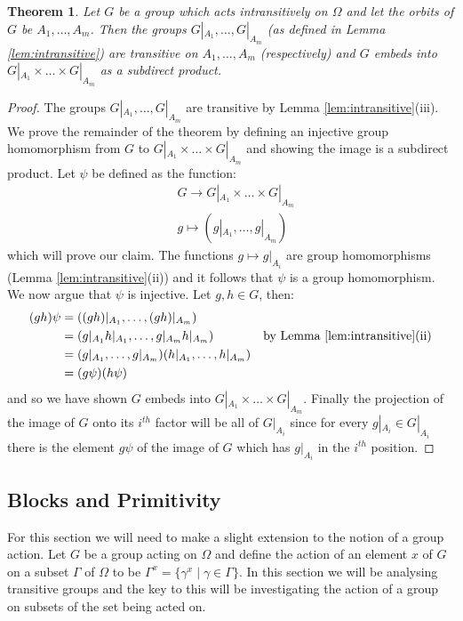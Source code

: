 \documentclass[]{article}
\newtheorem{thm}{Theorem}[section]
\theoremstyle{definition}
\begin{document}
\begin{thm} \label{thm:intransitive}
	Let $G$ be a group which acts intransitively on $\Omega$ and let the orbits of $G$ be $A_1, \dots, A_m$. Then the groups $G|_{A_1}, \dots, G|_{A_m}$ (as defined in Lemma \ref{lem:intransitive}) are transitive on $A_1,\dots ,A_m$ (respectively) and $G$ embeds into $G|_{A_1} \times \dots \times G|_{A_m}$ as a subdirect product.
\end{thm}

\begin{proof}
	The groups $G|_{A_1}, \dots, G|_{A_m}$ are transitive by Lemma \ref{lem:intransitive}(iii). We prove the remainder of the theorem by defining an injective group homomorphism from $G$ to $G|_{A_1} \times \dots \times G|_{A_m}$ and showing the image is a subdirect product. Let $\psi$ be defined as the function:
	\begin{align*}
		& G \rightarrow G|_{A_1} \times \dots \times G|_{A_m} \\
		& g \mapsto (g|_{A_1}, \dots, g|_{A_m})
	\end{align*}
	which will prove our claim. The functions $g \mapsto g|_{A_i}$ are group homomorphisms (Lemma \ref{lem:intransitive}(ii)) and it follows that $\psi$ is a group homomorphism. We now argue that $\psi$ is injective. Let $g,h \in G$, then:
	\begin{align*}
		(gh)\psi & = ((gh)|_{A_1}, \dots, (gh)|_{A_m}) & \\
		& = (g|_{A_1}h|_{A_1}, \dots, g|_{A_m}h|_{A_m}) & \mbox{by Lemma \ref{lem:intransitive}(ii)} \\
		& = (g|_{A_1}, \dots, g|_{A_m})(h|_{A_1}, \dots, h|_{A_m}) & \\
		& = (g\psi)(h\psi)
	\end{align*}
	and so we have shown $G$ embeds into $G|_{A_1} \times \dots \times G|_{A_m}$. Finally the projection of the image of $G$ onto its $i^{th}$ factor will be all of $G|_{A_i}$ since for every $g|_{A_i} \in G|_{A_i}$ there is the element $g\psi$ of the image of $G$ which has $g|_{A_i}$ in the $i^{th}$ position.
\end{proof}

\subsection{Blocks and Primitivity}
For this section we will need to make a slight extension to the notion of a group action. Let $G$ be a group acting on $\Omega$ and define the action of an element $x$ of $G$ on a subset $\Gamma$ of $\Omega$ to be $\Gamma^x = \{\gamma^x \; | \; \gamma \in \Gamma \}$. In this section we will be analysing transitive groups and the key to this will be investigating the action of a group on subsets of the set being acted on.
\end{document}
